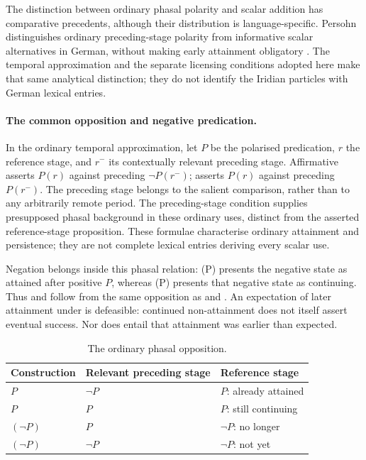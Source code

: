 The distinction between ordinary phasal polarity and scalar addition has
comparative precedents, although their distribution is language-specific.
Persohn distinguishes ordinary preceding-stage polarity from informative
scalar alternatives in German, without making early attainment obligatory
\cite[§§2.1--2.2, 6]{persohn2024scalar}. The temporal approximation and the
separate licensing conditions adopted here make that same analytical distinction;
they do not identify the Iridian particles with German lexical entries.

\paragraph{The common opposition and negative predication.}
In the ordinary temporal approximation, let $P$ be the polarised predication,
$r$ the reference stage, and $r^{-}$ its contextually relevant preceding stage.
Affirmative  asserts $P(r)$ against preceding $\neg P(r^{-})$;
 asserts $P(r)$ against preceding $P(r^{-})$. The preceding stage
belongs to the salient comparison, rather than to any arbitrarily remote
period. The preceding-stage condition supplies presupposed phasal background in
these ordinary uses, distinct from the asserted reference-stage proposition.
These formulae characterise ordinary attainment and persistence;
they are not complete lexical entries deriving every scalar use.

Negation belongs inside this phasal relation: (\neg P) presents the
negative state as attained after positive $P$, whereas (\neg P)
presents that negative state as continuing. Thus  and
 follow from the same opposition as  and
. An expectation of later attainment under  is
defeasible: continued non-attainment does not itself assert eventual success.
Nor does  entail that attainment was earlier than expected.

\begin{table}[ht]
\caption{The ordinary phasal opposition.}\label{tab:phasal-polarity}
\begin{tabularx}{\textwidth}{l L L}
\toprule
Construction & Relevant preceding stage & Reference stage \\
\midrule
{} $P$ & $\neg P$ & $P$: already attained \\
 $P$ & $P$ & $P$: still continuing \\
 $(\neg P)$ & $P$ & $\neg P$: no longer \\
 $(\neg P)$ & $\neg P$ & $\neg P$: not yet \\
\bottomrule
\end{tabularx}
\end{table}

